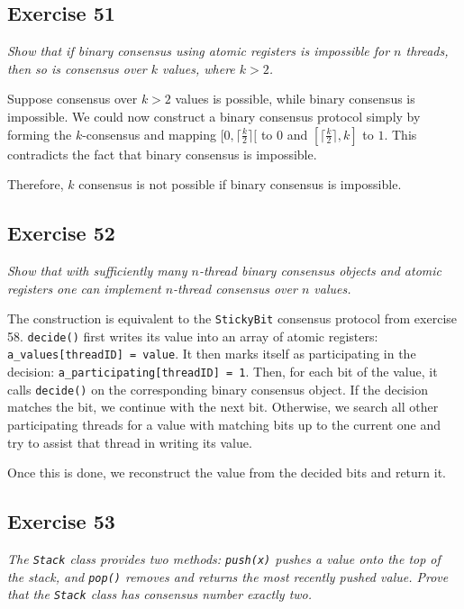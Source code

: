 \documentclass[a4paper,10pt]{article}
\begin{document}
\subsection{Exercise 51}

\emph{Show that if binary consensus using atomic registers is impossible for
$n$ threads, then so is consensus over $k$ values, where $k > 2$.}

\vspace{3mm}

Suppose consensus over $k > 2$ values is possible, while binary consensus
is impossible. We could now construct a binary consensus protocol simply by forming
the $k$-consensus and mapping $[0, \lceil \frac{k}{2} \rceil[$ to $0$ and
$[\lceil \frac{k}{2} \rceil, k]$ to $1$. This contradicts the fact that binary consensus is impossible.

Therefore, $k$ consensus is not possible if binary consensus is impossible.

\subsection{Exercise 52}

\emph{Show that with sufficiently many $n$-thread binary consensus objects
and atomic registers one can implement $n$-thread consensus over $n$ values.}

\vspace{3mm}

The construction is equivalent to the \lstinline|StickyBit| consensus protocol from
exercise 58. \lstinline|decide()| first writes its value into an array of atomic registers: \lstinline|a_values[threadID] = value|. It then marks itself as participating in the decision: \lstinline|a_participating[threadID] = 1|. Then, for each bit of the value, it calls \lstinline|decide()| on
the corresponding binary consensus object. If the decision matches the bit, we continue with the next bit.
Otherwise, we search all other participating threads for a value with matching bits up to the current one
and try to assist that thread in writing its value.

Once this is done, we reconstruct the value from the decided bits and return it.

\subsection{Exercise 53}

\emph{The \lstinline|Stack| class provides two methods: \lstinline|push(x)| pushes a value onto the top of the stack, and \lstinline|pop()| removes and returns the most recently pushed value. Prove that the \lstinline|Stack| class has consensus number exactly two.}
\end{document}
